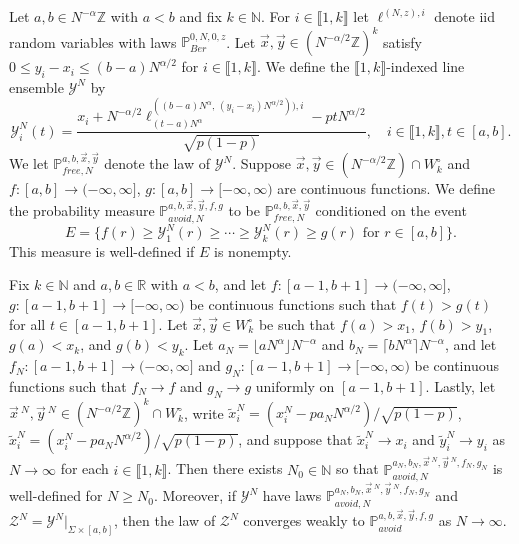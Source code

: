 \begin{definition}\label{scaledavoid}
	Let $a,b\in N^{-\alpha}\mathbb{Z}$ with $a<b$ and fix $k\in\mathbb{N}$. For $i\in\llbracket 1,k\rrbracket$ let $\ell^{(N,z),i}$ denote iid random variables with laws $\mathbb{P}^{0,N,0,z}_{Ber}$. Let $\vec{x},\vec{y}\in(N^{-\alpha/2}\mathbb{Z})^k$ satisfy $0\leq y_i-x_i \leq (b-a)N^{\alpha/2}$ for $i\in\llbracket 1,k\rrbracket$. We define the $\llbracket 1,k\rrbracket$-indexed line ensemble $\mathcal{Y}^N$ by
	\[
	\mathcal{Y}^N_i(t) = \frac{x_i + N^{-\alpha/2}\ell^{((b-a)N^\alpha,\,(y_i-x_i)N^{\alpha/2})),i}_{(t-a)N^\alpha} - ptN^{\alpha/2}}{\sqrt{p(1-p)}}, \quad i\in\llbracket 1,k\rrbracket, t\in [a,b].
	\]
	We let $\mathbb{P}^{a,b,\vec{x},\vec{y}}_{free,N}$ denote the law of $\mathcal{Y}^N$. Suppose $\vec{x},\vec{y}\in (N^{-\alpha/2}\mathbb{Z})\cap W_k^\circ$ and $f : [a,b] \to (-\infty,\infty]$, $g:[a,b]\to [-\infty,\infty)$ are continuous functions. We define the probability measure $\mathbb{P}^{a,b,\vec{x},\vec{y},f,g}_{avoid,N}$ to be $\mathbb{P}^{a,b,\vec{x},\vec{y}}_{free,N}$ conditioned on the event
	\[
	E = \{f(r) \geq \mathcal{Y}^N_1(r) \geq \cdots \geq \mathcal{Y}^N_k(r) \geq g(r) \mbox{ for } r\in[a,b]\}.
	\]
	This measure is well-defined if $E$ is nonempty.
\end{definition}

\begin{lemma}\label{scaledavoidBB}
	Fix $k\in\mathbb{N}$ and $a,b\in\mathbb{R}$ with $a<b$, and let $f:[a-1,b+1]\to(-\infty,\infty]$, $g:[a-1,b+1]\to[-\infty,\infty)$ be continuous functions such that $f(t) > g(t)$ for all $t\in[a-1,b+1]$. Let $\vec{x},\vec{y}\in W_k^\circ$ be such that $f(a) > x_1$, $f(b) > y_1$, $g(a) < x_k$, and $g(b) < y_k$. Let $a_N = \lfloor aN^\alpha\rfloor N^{-\alpha}$ and $b_N = \lceil bN^\alpha\rceil N^{-\alpha}$, and let $f_N : [a-1,b+1]\to(-\infty,\infty]$ and $g_N : [a-1,b+1]\to[-\infty,\infty)$ be continuous functions such that $f_N\to f$ and $g_N\to g$ uniformly on $[a-1,b+1]$. Lastly, let $\vec{x}\,^N, \vec{y}\,^N \in (N^{-\alpha/2}\mathbb{Z})^k \cap W_k^\circ$, write $\tilde{x}^N_i = (x_i^N - pa_N N^{\alpha/2})/\sqrt{p(1-p)}$, $\tilde{x}^N_i = (x_i^N - pa_N N^{\alpha/2})/\sqrt{p(1-p)}$, and suppose that $\tilde{x}^N_i \to x_i$ and $\tilde{y}^N_i \to y_i$ as $N\to\infty$ for each $i\in\llbracket 1,k\rrbracket$. Then there exists $N_0 \in \mathbb{N}$ so that $\mathbb{P}^{a_N,b_N,\vec{x}\,^N,\vec{y}\,^N,f_N,g_N}_{avoid,N}$ is well-defined for $N\geq N_0$. Moreover, if $\mathcal{Y}^N$ have laws $\mathbb{P}^{a_N,b_N,\vec{x}\,^N,\vec{y}\,^N,f_N,g_N}_{avoid,N}$ and $\mathcal{Z}^N = \mathcal{Y}^N|_{\Sigma\times[a,b]}$, then the law of $\mathcal{Z}^N$ converges weakly to $\mathbb{P}^{a,b,\vec{x},\vec{y},f,g}_{avoid}$ as $N\to\infty$.
\end{lemma}

